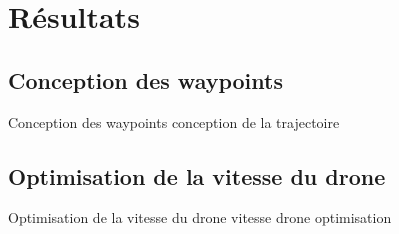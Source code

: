 \section{Résultats}

\subsection{Conception des waypoints}
\begin{frame}{Conception des waypoints}
conception de la trajectoire
\end{frame}

\subsection{Optimisation de la vitesse du drone}

\begin{frame}{Optimisation de la vitesse du drone}
vitesse drone optimisation
\end{frame}
